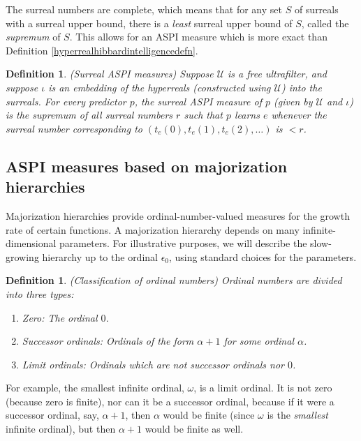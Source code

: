 \documentclass{article}
\newtheorem{definition}[theorem]{Definition}
\begin{document}
The surreal numbers are complete, which means that for
any set $S$ of surreals with a surreal upper bound,
there is a \emph{least} surreal upper bound of $S$, called the \emph{supremum} of $S$.
This allows for an ASPI measure which is more exact
than Definition \ref{hyperrealhibbardintelligencedefn}.

\begin{definition}
\label{surrealhibbardintelligencedefn}
    (Surreal ASPI measures)
    Suppose $\mathcal U$ is a free ultrafilter, and suppose $\iota$ is an embedding
    of the hyperreals (constructed using $\mathcal U$) into the surreals.
    For every predictor $p$, the \emph{surreal ASPI measure} of $p$ (given
    by $\mathcal U$ and $\iota$)
    is the supremum of all surreal numbers $r$ such that
    $p$ learns $e$ whenever the surreal number corresponding to
    $(t_e(0),t_e(1),t_e(2),\ldots)$ is $<r$.
\end{definition}

\subsection{ASPI measures based on majorization hierarchies}

Majorization hierarchies \cite{weiermann2002slow}
provide ordinal-number-valued measures for the growth
rate of certain functions. A majorization hierarchy depends
on many infinite-dimensional parameters. For illustrative purposes,
we will describe the slow-growing hierarchy up to the ordinal $\epsilon_0$,
using standard choices for the parameters.

\begin{definition}
    (Classification of ordinal numbers)
    Ordinal numbers are divided into three types:
    \begin{enumerate}
        \item Zero: The ordinal $0$.
        \item Successor ordinals: Ordinals of the form $\alpha+1$ for some ordinal $\alpha$.
        \item Limit ordinals: Ordinals which are not successor ordinals nor $0$.
    \end{enumerate}
\end{definition}

For example, the smallest infinite ordinal, $\omega$, is a limit ordinal. It is not zero
(because zero is finite),
nor can it be a successor ordinal, because if it were a successor ordinal, say, $\alpha+1$,
then $\alpha$ would be finite (since $\omega$ is the \emph{smallest} infinite ordinal),
but then $\alpha+1$ would be finite as well.
\end{document}
